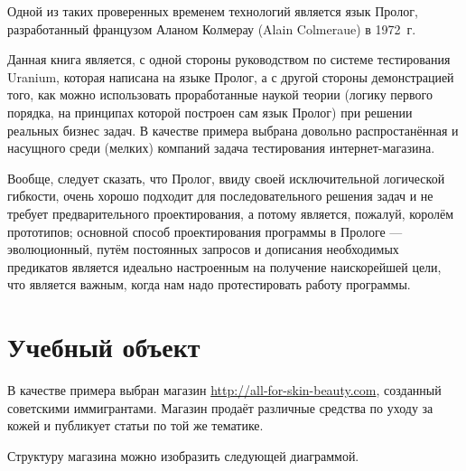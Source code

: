 \documentclass[a4paper]{book}
\def\ur{Uranium}
\begin{document}
Одной из таких проверенных временем технологий является язык
Пролог, разработанный французом Аланом Колмерау (Alain Colmeraue)
в 1972~г.

Данная книга является, с одной стороны руководством по системе
тестирования \ur, которая написана на языке Пролог, а с другой
стороны демонстрацией того, как можно использовать проработанные
наукой теории (логику первого порядка, на принципах которой
построен сам язык Пролог) при решении реальных бизнес задач. В
качестве примера выбрана довольно распростанённая и насущного
среди (мелких) компаний задача тестирования интернет-магазина.

Вообще, следует сказать, что Пролог, ввиду своей исключительной
логической гибкости, очень хорошо подходит для последовательного
решения задач и не требует предварительного проектирования, а
потому является, пожалуй, королём прототипов; основной способ
проектирования программы в Прологе --- эволюционный, путём
постоянных запросов и дописания необходимых предикатов является
идеально настроенным на получение наискорейшей цели, что является
важным, когда нам надо протестировать работу программы.

\chapter{Учебный объект}

В качестве примера выбран магазин
\url{http://all-for-skin-beauty.com}, созданный советскими
иммигрантами. Магазин продаёт различные средства по уходу за
кожей и публикует статьи по той же тематике.

Структуру магазина можно изобразить следующей диаграммой.

\begin{figure}[h!]
\label{eshop}
\end{figure}
\end{document}
